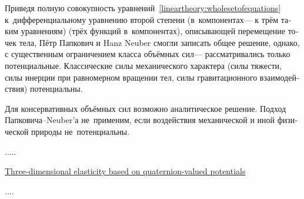 {
\begin{otherlanguage}{russian}
\fontsize{8}{9}\selectfont

Приведя
полную совокупность уравнений~\eqref{lineartheory:wholesetofequations}
к~дифференциальному уравнению второй степени
(в~компонентах\:--- к трём таким уравнениям)
(трёх функций в~компонентах),
описывающей перемещение точек тела,
Пётр Папкович и Hanz Neuber смогли записать общее решение,
однако,
с существенным ограничением класса объёмных сил\:---
рассматривались только потенциальные.
Классические силы механического характера
(силы тяжести, силы инерции при равномерном вращении тел, силы гравитационного взаимодействия)
потенциальны.

Для консервативных объёмных сил возможно аналитическое решение.
Подход Папковича\hbox{--}Neuber’а не~применим, если воздействия механической и иной физической природы не~потенциальны.

\end{otherlanguage}
}

.....

\href{https://www.sciencedirect.com/science/article/pii/S0020768314002340}{Three\hbox{-}dimensional elasticity based on quaternion\hbox{-}valued potentials}

....
